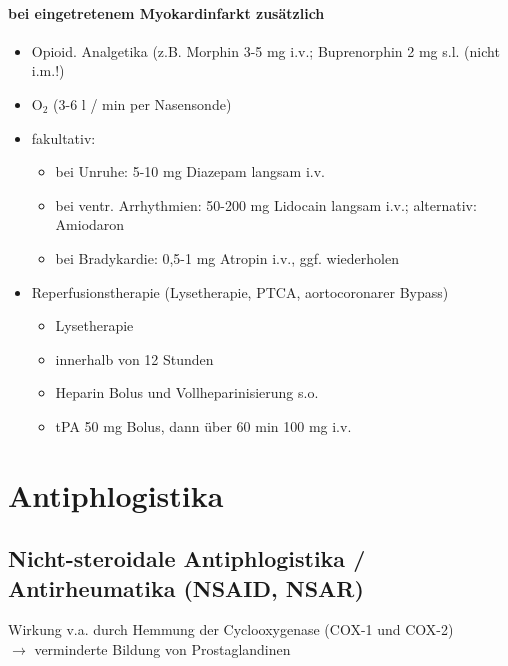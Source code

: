 \documentclass[10pt,a4paper]{report}
\begin{document}
\subsubsection{bei eingetretenem Myokardinfarkt zusätzlich} %
\label{par:bei_eingetretenem_myokardinfarkt_zus_tzlich}
\begin{itemize}
	\item Opioid. Analgetika (z.B. Morphin 3-5 mg i.v.; Buprenorphin 2 mg s.l. (nicht i.m.!)
	\item O$_2$ (3-6 l / min per Nasensonde)
	\item fakultativ: 
	\begin{itemize}
		\item bei Unruhe: 5-10 mg Diazepam langsam i.v.
		\item bei ventr. Arrhythmien: 50-200 mg Lidocain langsam i.v.; alternativ: Amiodaron
	 	\item bei Bradykardie: 0,5-1 mg Atropin i.v., ggf. wiederholen
	\end{itemize}
	\item Reperfusionstherapie (Lysetherapie, PTCA, aortocoronarer Bypass)
	\begin{itemize}
		\item Lysetherapie
		\item innerhalb von 12 Stunden
		\item Heparin Bolus und Vollheparinisierung s.o.
 		\item  tPA 50 mg Bolus, dann über 60 min 100 mg i.v.
	\end{itemize}
\end{itemize}
\chapter{Antiphlogistika} %
\label{cha:antiphlogistika}
\section{Nicht-steroidale Antiphlogistika / Antirheumatika (NSAID, NSAR)} %
\label{sec:nicht_steroidale_antiphlogistika_antirheumatika_nsaid_nsar_}
Wirkung v.a. durch Hemmung der Cyclooxygenase (COX-1 und COX-2)\\
$\rightarrow$ verminderte Bildung von Prostaglandinen
\end{document}
